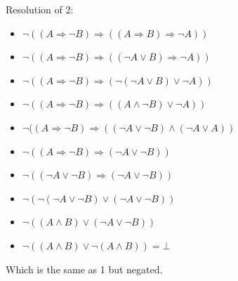 \documentclass[10pt,a4paper]{article}
\begin{document}
Resolution of 2:
\begin{itemize}
\item $\neg ((A\Rightarrow \neg B)\Rightarrow ((A\Rightarrow B)\Rightarrow \neg A))$
\item $\neg ((A\Rightarrow \neg B)\Rightarrow ((\neg A\vee B)\Rightarrow \neg A))$
\item $\neg ((A\Rightarrow \neg B)\Rightarrow (\neg (\neg A\vee B)\vee \neg A))$
\item $\neg ((A\Rightarrow \neg B)\Rightarrow ( ( A\wedge \neg B)\vee \neg A))$
\item $\neg ((A\Rightarrow \neg B)\Rightarrow (  (\neg A \vee \neg B) \wedge (\neg A \vee A))$
\item $\neg ((A\Rightarrow \neg B)\Rightarrow (\neg A \vee \neg B))$
\item $\neg ((\neg A\vee \neg B)\Rightarrow (\neg A \vee \neg B))$
\item $\neg (\neg (\neg A\vee \neg B)\vee (\neg A \vee \neg B))$
\item $\neg ( ( A\wedge  B)\vee (\neg A \vee \neg B))$
\item $\neg ( ( A\wedge  B)\vee \neg ( A \wedge B))=\bot$
\end{itemize}
Which is the same as 1 but negated.\\
\end{document}
